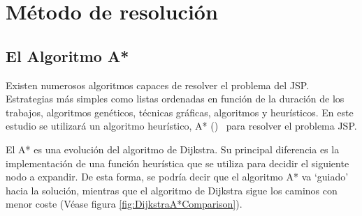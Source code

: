 
\section{Método de resolución}

\subsection{El Algoritmo A*}
\label{ssec:AlgoritmoA*}

Existen numerosos algoritmos capaces de resolver el problema del JSP\@.
Estrategias más simples como listas ordenadas en función de la duración
de los trabajos, algoritmos genéticos, técnicas gráficas,
algoritmos  y heurísticos.
En este estudio se utilizará un algoritmo heurístico, A* ()~\cite{HNR68}
para resolver el problema JSP\@.

El A* es una evolución del algoritmo de Dijkstra.
Su principal diferencia es la implementación de una función heurística
que se utiliza para decidir el siguiente nodo a expandir.
De esta forma, se podría decir que el algoritmo A* va `guiado'
hacia la solución, mientras que el algoritmo de Dijkstra
sigue los caminos con menor coste (Véase figura \ref{fig:DijkstraA*Comparison}).

